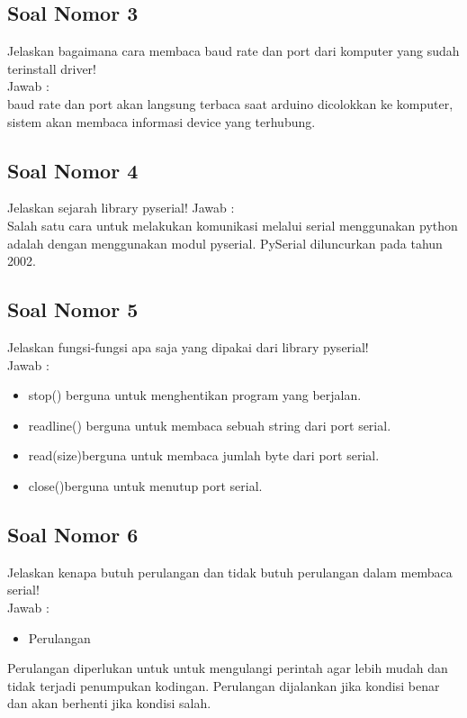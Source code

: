 \subsection{Soal Nomor 3}
Jelaskan bagaimana cara membaca baud rate dan port dari komputer yang sudah
terinstall driver! \\
Jawab :\\
baud rate dan port akan langsung terbaca saat arduino dicolokkan ke komputer, sistem akan membaca informasi device yang terhubung.

\subsection{Soal Nomor 4}
Jelaskan sejarah library pyserial!
Jawab : \\
Salah satu cara untuk melakukan komunikasi melalui serial menggunakan python adalah dengan menggunakan modul pyserial. PySerial diluncurkan pada tahun 2002.

\subsection{Soal Nomor 5}
Jelaskan fungsi-fungsi apa saja yang dipakai dari library pyserial!\\
Jawab :\\
\begin{itemize}
\item stop() berguna untuk menghentikan program yang berjalan.
\item readline() berguna untuk membaca sebuah string dari port serial.
\item read(size)berguna untuk membaca jumlah byte dari port serial.
\item close()berguna untuk menutup port serial.
\end{itemize}

\subsection{Soal Nomor 6}
Jelaskan kenapa butuh perulangan dan tidak butuh perulangan dalam membaca serial!\\
Jawab :\\
\begin{itemize}
\item Perulangan
\end{itemize}
Perulangan diperlukan untuk untuk mengulangi perintah agar lebih mudah dan tidak terjadi penumpukan kodingan. Perulangan dijalankan jika kondisi benar dan akan berhenti jika kondisi salah.

